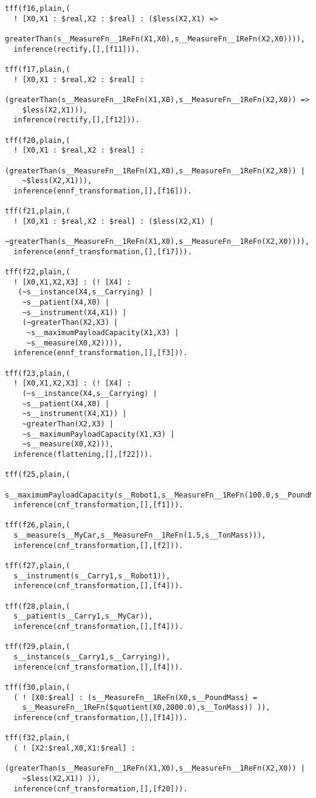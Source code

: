 \documentclass{article}
\begin{document}
\begin{verbatim}
tff(f16,plain,(
  ! [X0,X1 : $real,X2 : $real] : ($less(X2,X1) => 
    greaterThan(s__MeasureFn__1ReFn(X1,X0),s__MeasureFn__1ReFn(X2,X0)))),
  inference(rectify,[],[f11])).

tff(f17,plain,(
  ! [X0,X1 : $real,X2 : $real] : 
    (greaterThan(s__MeasureFn__1ReFn(X1,X0),s__MeasureFn__1ReFn(X2,X0)) => 
    $less(X2,X1))),
  inference(rectify,[],[f12])).

tff(f20,plain,(
  ! [X0,X1 : $real,X2 : $real] : 
    (greaterThan(s__MeasureFn__1ReFn(X1,X0),s__MeasureFn__1ReFn(X2,X0)) |
    ~$less(X2,X1))),
  inference(ennf_transformation,[],[f16])).

tff(f21,plain,(
  ! [X0,X1 : $real,X2 : $real] : ($less(X2,X1) | 
    ~greaterThan(s__MeasureFn__1ReFn(X1,X0),s__MeasureFn__1ReFn(X2,X0)))),
  inference(ennf_transformation,[],[f17])).

tff(f22,plain,(
  ! [X0,X1,X2,X3] : (! [X4] : 
   (~s__instance(X4,s__Carrying) | 
    ~s__patient(X4,X0) | 
    ~s__instrument(X4,X1)) | 
    (~greaterThan(X2,X3) | 
     ~s__maximumPayloadCapacity(X1,X3) | 
     ~s__measure(X0,X2)))),
  inference(ennf_transformation,[],[f3])).

tff(f23,plain,(
  ! [X0,X1,X2,X3] : (! [X4] : 
    (~s__instance(X4,s__Carrying) | 
    ~s__patient(X4,X0) | 
    ~s__instrument(X4,X1)) | 
    ~greaterThan(X2,X3) | 
    ~s__maximumPayloadCapacity(X1,X3) | 
    ~s__measure(X0,X2))),
  inference(flattening,[],[f22])).

tff(f25,plain,(
  s__maximumPayloadCapacity(s__Robot1,s__MeasureFn__1ReFn(100.0,s__PoundMass))),
  inference(cnf_transformation,[],[f1])).

tff(f26,plain,(
  s__measure(s__MyCar,s__MeasureFn__1ReFn(1.5,s__TonMass))),
  inference(cnf_transformation,[],[f2])).

tff(f27,plain,(
  s__instrument(s__Carry1,s__Robot1)),
  inference(cnf_transformation,[],[f4])).

tff(f28,plain,(
  s__patient(s__Carry1,s__MyCar)),
  inference(cnf_transformation,[],[f4])).

tff(f29,plain,(
  s__instance(s__Carry1,s__Carrying)),
  inference(cnf_transformation,[],[f4])).

tff(f30,plain,(
  ( ! [X0:$real] : (s__MeasureFn__1ReFn(X0,s__PoundMass) = 
    s__MeasureFn__1ReFn($quotient(X0,2000.0),s__TonMass)) )),
  inference(cnf_transformation,[],[f14])).

tff(f32,plain,(
  ( ! [X2:$real,X0,X1:$real] : 
    (greaterThan(s__MeasureFn__1ReFn(X1,X0),s__MeasureFn__1ReFn(X2,X0)) | 
    ~$less(X2,X1)) )),
  inference(cnf_transformation,[],[f20])).


\end{verbatim}
\end{document}
